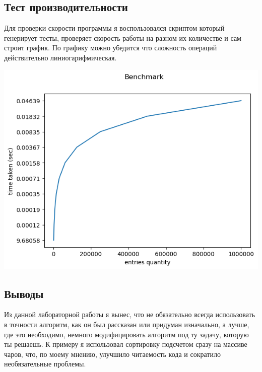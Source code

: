 \documentclass[12pt]{article}
\begin{document}
\subsection*{Тест производительности}
Для проверки скорости программы я воспользовался скриптом который генерирует тесты, проверяет скорость работы на разном их 
количестве и сам строит график. По графику можно убедится что сложность операций действительно линиогарифмическая.

\includegraphics[width=\linewidth]{benchmark}

\subsection*{Выводы}

Из данной лабораторной работы я вынес, что не обязательно всегда использовать в точности алгоритм, как он был рассказан или придуман изначально, а лучше, где это необходимо, немного модифицировать алгоритм под ту задачу, которую ты решаешь. К примеру я использовал сортировку подсчетом сразу на массиве чаров, что, по моему мнению, улучшило читаемость кода и сократило необязательные проблемы.
\end{document}
